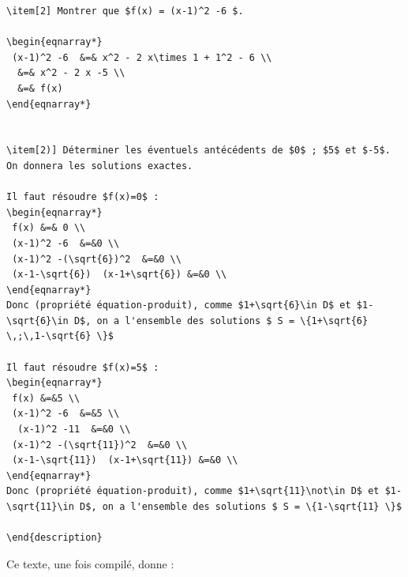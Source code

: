 {\begin{multicols}{2}
\begin{verbatim}
\item[2] Montrer que $f(x) = (x-1)^2 -6 $. 

\begin{eqnarray*}
 (x-1)^2 -6  &=& x^2 - 2 x\times 1 + 1^2 - 6 \\
  &=& x^2 - 2 x -5 \\
  &=& f(x) 
\end{eqnarray*}


\item[2)] Déterminer les éventuels antécédents de $0$ ; $5$ et $-5$. On donnera les solutions exactes. 

Il faut résoudre $f(x)=0$ : 
\begin{eqnarray*}
 f(x) &=& 0 \\
 (x-1)^2 -6  &=&0 \\
 (x-1)^2 -(\sqrt{6})^2  &=&0 \\
 (x-1-\sqrt{6})  (x-1+\sqrt{6}) &=&0 \\
\end{eqnarray*}
Donc (propriété équation-produit), comme $1+\sqrt{6}\in D$ et $1-\sqrt{6}\in D$, on a l'ensemble des solutions $ S = \{1+\sqrt{6} \,;\,1-\sqrt{6} \}$

Il faut résoudre $f(x)=5$ : 
\begin{eqnarray*}
 f(x) &=&5 \\
 (x-1)^2 -6  &=&5 \\
  (x-1)^2 -11  &=&0 \\
 (x-1)^2 -(\sqrt{11})^2  &=&0 \\
 (x-1-\sqrt{11})  (x-1+\sqrt{11}) &=&0 \\
\end{eqnarray*}
Donc (propriété équation-produit), comme $1+\sqrt{11}\not\in D$ et $1-\sqrt{11}\in D$, on a l'ensemble des solutions $ S = \{1-\sqrt{11} \}$

\end{description}

\end{verbatim}
\end{multicols}
}
Ce texte, une fois compilé, donne :

